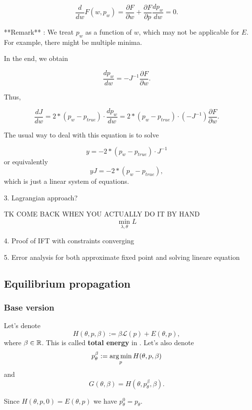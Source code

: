 \documentclass[a4paper,10pt]{report}
\begin{document}
$$\frac{d}{dw}F(w,p_w) = \frac{\partial F}{\partial w} + \frac{\partial F}{\partial p}\frac{d p_w}{dw}= 0 .$$

**Remark** : We treat $p_w$ as a function of $w$, which may not be applicable for $E$.
For example, there might be multiple minima.

In the end, we obtain

$$ \frac{d p_w}{dw} = - J^{-1} \frac{\partial F}{\partial w}.$$

Thus,

$$\frac{d J}{dw} = 2*(p_w-p_{true})\cdot \frac{d p_w}{dw} = 2*(p_w-p_{true})\cdot (-J^{-1}) \frac{\partial F}{\partial w}.$$

The usual way to deal with this equation is to solve

$$y =- 2*(p_w-p_{true}) \cdot J^{-1}$$
or equivalently
$$ yJ = -2*(p_w - p_{true}),$$ which is just a linear system of equations.

3. Lagrangian approach?

TK COME BACK WHEN YOU ACTUALLY DO IT BY HAND
 \begin{equation}
\min_{\lambda,\theta} L
 \end{equation}

4. Proof of IFT with constraints converging

5. Error analysis for both approximate fixed point and solving lineare equation
\subsection{ Equilibrium propagation}

\subsubsection{Base version}

Let's denote
\begin{equation}
H(\theta, p, \beta) := \beta \mathcal{L}(p) + E(\theta, p),
\end{equation}
where $\beta \in \mathbb{R}$.
 This is called \textbf{total energy} in \cite{eqprop}. Let's also denote
\begin{equation}
p_{\theta}^{\beta}:=\operatorname*{arg\,min}_p H(\theta, p, \beta)
\end{equation}
and
\begin{equation}
 G(\theta, \beta) = H(\theta, p_\theta^\beta, \beta).
\end{equation}

Since $H(\theta,p,0) = E(\theta,p)$ we have $p_{\theta}^{0}=p_{\theta}$.
\end{document}
